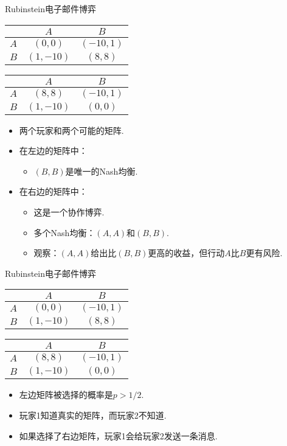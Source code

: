 {Rubinstein电子邮件博弈}
\begin{table}[ht]
    \centering
\begin{tabular}{c|cc}
&$A$ & $B$ \\
\hline
$A$ & $(0, 0)$ & $(-10, 1)$ \\
$B$ & $(1, -10)$ & $(8, 8)$ \\
\end{tabular}
\qquad
\begin{tabular}{c|cc}
&$A$ & $B$ \\
\hline
$A$ & $(8, 8)$ & $(-10, 1)$ \\
$B$ & $(1, -10)$ & $(0, 0)$ \\
\end{tabular}
\end{table}
\begin{itemize}
\item 两个玩家和两个可能的矩阵.
\item 在左边的矩阵中：
\begin{itemize}
\item $(B,B)$是唯一的Nash均衡.
\end{itemize}
\item 在右边的矩阵中：
\begin{itemize}
\item 这是一个协作博弈.
\item 多个Nash均衡：$(A,A)$和$(B,B)$.
\item 观察：$(A,A)$给出比$(B,B)$更高的收益，但行动$A$比$B$更有风险.
\end{itemize}
\end{itemize}


{Rubinstein电子邮件博弈}
\begin{table}[ht]
    \centering
\begin{tabular}{c|cc}
&$A$ & $B$ \\
\hline
$A$ & $(0, 0)$ & $(-10, 1)$ \\
$B$ & $(1, -10)$ & $(8, 8)$ \\
\end{tabular}
\qquad
\begin{tabular}{c|cc}
&$A$ & $B$ \\
\hline
$A$ & $(8, 8)$ & $(-10, 1)$ \\
$B$ & $(1, -10)$ & $(0, 0)$ \\
\end{tabular}
\end{table}
\begin{itemize}
\item 左边矩阵被选择的概率是$p>1/2$.
\item 玩家1知道真实的矩阵，而玩家2不知道.
\item 如果选择了右边矩阵，玩家1会给玩家2发送一条消息.
\end{itemize}



